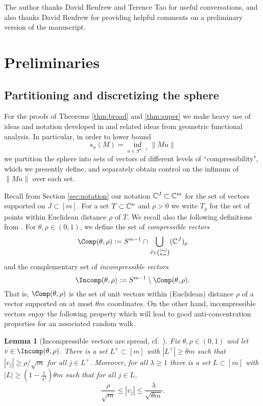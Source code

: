 \documentclass[aop,preprint]{imsart}
\theoremstyle{plain}
\newtheorem{lemma}[theorem]{Lemma}
\theoremstyle{definition}
\theoremstyle{remark}
\numberwithin{equation}{section}
\numberwithin{theorem}{section}
\begin{document}
The author thanks David Renfrew and Terence Tao for useful conversations, and also thanks David Renfrew for providing helpful comments on a preliminary version of the manuscript.



\section{Preliminaries}		\label{sec:anti}



\subsection{Partitioning and discretizing the sphere}		\label{sec:net}

For the proofs of Theorems \ref{thm:broad} and \ref{thm:super} we make heavy use of ideas and notation developed in \citep{LPRT,LPRTV2,Rudelson:inv, RuVe:ilo} and related ideas from geometric functional analysis. 
In particular, in order to lower bound
\[
s_n(M) = \inf_{u\in S^{n-1}} \|Mu\|
\]
we partition the sphere into sets of vectors of different levels of ``compressibility", which we presently define, and separately obtain control on the infimum of $\|Mu\|$ over each set. 


Recall from Section \ref{sec:notation} our notation ${\mathbb C}^J\subset {\mathbb C}^m$ for the set of vectors supported on $J\subset[m]$.
For a set $T\subset {\mathbb C}^n$ and $\rho>0$ we write $T_\rho$ for the set of points within Euclidean distance $\rho$ of $T$.
We recall also the following definitions from \citep{RuZe}.
For $\theta,\rho\in (0,1)$, we define the set of \emph{compressible vectors}
\begin{equation}	\label{def:compr}
\Comp(\theta,\rho) := S^{m-1}\cap\bigcup_{J\in {[m]\choose  \theta m}} (\C^J)_\rho
\end{equation}
and the complementary set of \emph{incompressible vectors}
\begin{equation}	\label{def:incompr}
\Incomp(\theta,\rho) := S^{m-1}\setminus \Comp(\theta,\rho).
\end{equation}
That is, $\Comp(\theta,\rho)$ is the set of unit vectors within (Euclidean) distance $\rho$ of a vector supported on at most $\theta m$ coordinates.
On the other hand, incompressible vectors enjoy the following property which will lead to good anti-concentration properties for an associated random walk.

\begin{lemma}[Incompressible vectors are spread, cf.\ {\cite[Lemma 3.4]{RuVe:ilo}}]	\label{lem:spread}
Fix $\theta,\rho\in (0,1)$ and let $v\in \Incomp(\theta,\rho)$. 
There is a set $L^+\subset[m]$ with $|L^+|\ge \theta m$ such that $|v_j|\ge \rho/\sqrt{m}$ for all $j\in L^+$.
Moreover, for all $\lambda\ge1$ there is a set $L\subset [m]$ with $|L| \ge (1-\frac1{\lambda^2})\theta m$ such that for all $j\in L$, 
\[
\frac{\rho}{\sqrt{m}} \le |v_j| \le \frac{\lambda}{\sqrt{\theta m}}.
\]
\end{lemma}
\end{document}
